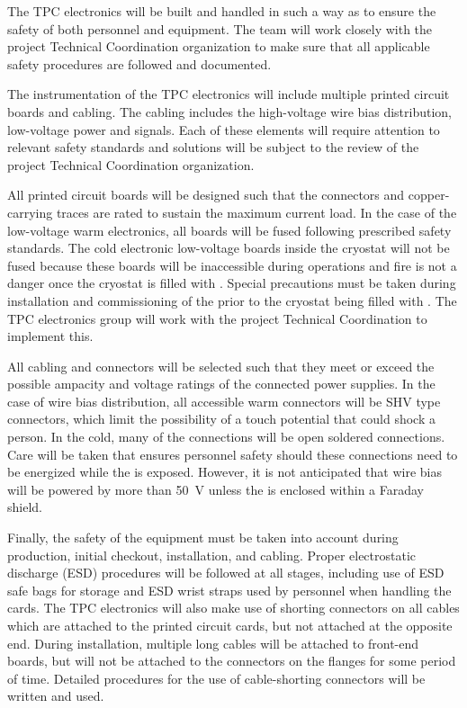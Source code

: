 The TPC electronics will be built and handled in such a way as to ensure the safety of both personnel and equipment.  The team will work closely with the project Technical Coordination organization to make sure that all applicable safety procedures are followed and documented.

The instrumentation of the TPC electronics will include multiple printed circuit boards and cabling.  The cabling includes the high-voltage wire bias distribution, low-voltage power and signals.  Each of these elements will require attention to relevant safety standards and solutions will be subject to the review of the project Technical Coordination organization.

All printed circuit boards will be designed such that the connectors and copper-carrying traces are rated to sustain the maximum current load.  In the case of the low-voltage warm electronics, all boards will be fused following prescribed safety standards.  The cold electronic low-voltage boards inside the cryostat will not be fused because these boards will be inaccessible during operations and fire is not a danger once the cryostat is filled with \lar.  Special precautions must be taken during installation and commissioning of the  prior to the cryostat being filled with \lar.  The TPC electronics group will work with the project Technical Coordination to implement this.

All cabling and connectors will be selected such that they meet or exceed the possible ampacity and voltage ratings of the connected power supplies.  In the case of  wire bias distribution, all accessible warm connectors will be SHV type connectors, which limit the possibility of a touch potential that could shock a person.  In the cold, many of the  connections will be open soldered connections. Care will be taken that ensures personnel safety should these connections need to be energized while the  is exposed.  However, it is not anticipated that  wire bias will be powered by more than \SI{50}{V} unless the  is enclosed within a Faraday shield.

Finally, the safety of the equipment must be taken into account during production, initial checkout, installation, and cabling.  Proper electrostatic discharge (ESD) procedures will be followed at all stages, including use of ESD safe bags for storage and ESD wrist straps used by personnel when handling the cards.  The TPC electronics will also make use of shorting connectors on all cables which are attached to the printed circuit cards, but not attached at the opposite end.  During installation, multiple long cables will be attached to front-end boards, but will not be attached to the connectors on the flanges for some period of time.  Detailed procedures for the use of cable-shorting connectors will be written and used.

